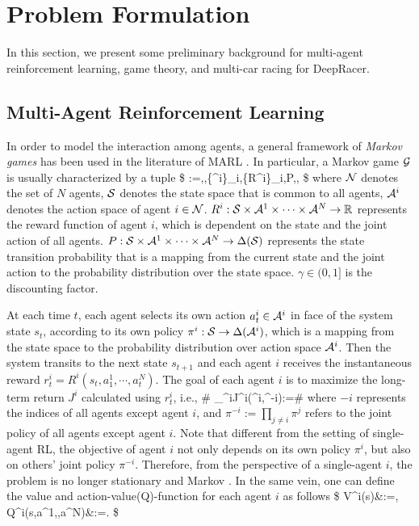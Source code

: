 


\section{Problem Formulation}\label{sec:background}

In this section, we present some preliminary background  for multi-agent reinforcement learning,   game theory, and multi-car racing for DeepRacer. 

\subsection{Multi-Agent Reinforcement Learning}\label{sec:MARL_form} 
In order to model the interaction among agents, a general framework of \emph{Markov games} has been used  in the literature of MARL \citep{littman1994markov}. 
In particular, a Markov game $\mathcal{G}$ is usually characterized by a tuple 
\$
\cG:=\la\cN,\cS,\{\cA^i\}_{i\in\cN},\{R^i\}_{i\in\cN},P,\gamma\ra,
\$
 where $\mathcal{N}$ denotes the set of $N$ agents, ${\mathcal{S}}$ denotes the state space that is common to all agents, $\mathcal{A}^i$ denotes the action space of agent $i\in\mathcal{N}$. $R^i:{\mathcal{S}}\times\mathcal{A}^1\times\cdots\times\mathcal{A}^N\to \mathbb{R}$ represents the reward function of agent $i$, which is dependent on the state and the joint action of all agents.   $P:{\mathcal{S}}\times\mathcal{A}^1\times\cdots\times\mathcal{A}^N\to\Delta({\mathcal{S}})$ represents the state transition probability that is a mapping from the current state and the joint action to the probability distribution over the state space.  $\gamma\in(0,1]$ is the discounting factor. 


At each time $t$, 
each agent  selects its own action $a^i_t\in\mathcal{A}^i$ in face of the  system state $s_t$, according to its own policy $\pi^i:{\mathcal{S}}\to \Delta(\mathcal{A}^i)$, which is a mapping from the state space to the probability distribution over action space $\mathcal{A}^i$. Then the system transits to the next state $s_{t+1}$ and each agent $i$ receives the instantaneous reward $r^i_t=R^i(s_t,a^1_1,\cdots,a^N_t)$. The goal of each agent $i$ is to maximize the long-term return $J^i$ calculated using $r^i_t$, i.e., 
\#\label{equ:def_return_i} 
\max_{\pi^i}\quad J^i(\pi^i,\pi^{-i}):=\EE\bigg[\sum_{t=0}^\infty \gamma^tr^i_t\bigggiven s_0,a^i_t\sim\pi^i(\cdot\given s_t)\bigg]
\#
where  $-i$ represents the indices of all agents except agent $i$, and 
$\pi^{-i}:=\prod_{j\neq i}\pi^j$ refers to the joint policy of all agents except agent $i$. 
Note that different from the setting of single-agent RL, the objective of agent $i$  not only depends on its own policy $\pi^i$, but also on others' joint policy $\pi^{-i}$. Therefore, from the perspective of a single-agent $i$, the problem is no longer stationary and Markov \citep{busoniu2008comprehensive}. In the same vein, one can define the value and action-value(Q)-function for each agent $i$ as follows 
\$
V^i(s)&:=\EE\bigg[\sum_{t=0}^\infty \gamma^tr^i_t\bigggiven s_0=s,a^i_t\sim\pi^i(\cdot\given s_t)\bigg], \\ Q^i(s,a^1,\cdots,a^N)&:=\EE\bigg[\sum_{t=0}^\infty \gamma^tr^i_t\bigggiven s_0=s,a^i_0=a^i,a^i_t\sim\pi^i(\cdot\given s_t)\bigg]. 
\$ 





